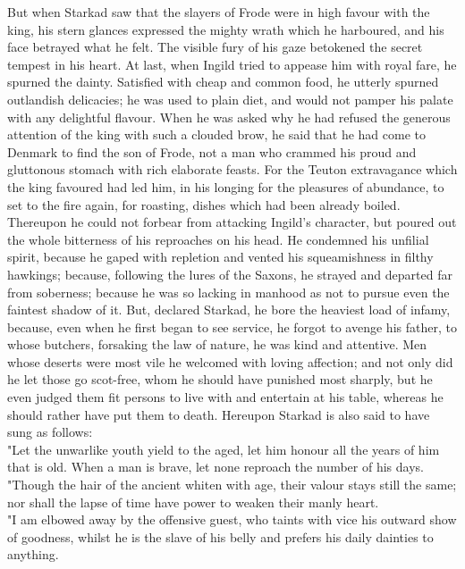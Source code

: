 \documentclass[10pt,a4paper]{report}
\begin{document}
But when Starkad saw that the slayers of Frode were in high favour with the king, his stern glances expressed the mighty wrath which he harboured, and his face betrayed what he felt. The visible fury of his gaze betokened the secret tempest in his heart. At last, when Ingild tried to appease him with royal fare, he spurned the dainty. Satisfied with cheap and common food, he utterly spurned outlandish delicacies; he was used to plain diet, and would not pamper his palate with any delightful flavour. When he was asked why he had refused the generous attention of the king with such a clouded brow, he said that he had come to Denmark to find the son of Frode, not a man who crammed his proud and gluttonous stomach with rich elaborate feasts. For the Teuton extravagance which the king favoured had led him, in his longing for the pleasures of abundance, to set to the fire again, for roasting, dishes which had been already boiled. Thereupon he could not forbear from attacking Ingild's character, but poured out the whole bitterness of his reproaches on his head. He condemned his unfilial spirit, because he gaped with repletion and vented his squeamishness in filthy hawkings; because, following the lures of the Saxons, he strayed and departed far from soberness; because he was so lacking in manhood as not to pursue even the faintest shadow of it. But, declared Starkad, he bore the heaviest load of infamy, because, even when he first began to see service, he forgot to avenge his father, to whose butchers, forsaking the law of nature, he was kind and attentive. Men whose deserts were most vile he welcomed with loving affection; and not only did he let those go scot-free, whom he should have punished most sharply, but he even judged them fit persons to live with and entertain at his table, whereas he should rather have put them to death. Hereupon Starkad is also said to have sung as follows:\\

"Let the unwarlike youth yield to the aged, let him honour all the years of him that is old. When a man is brave, let none reproach the number of his days.\\

"Though the hair of the ancient whiten with age, their valour stays still the same; nor shall the lapse of time have power to weaken their manly heart.\\

"I am elbowed away by the offensive guest, who taints with vice his outward show of goodness, whilst he is the slave of his belly and prefers his daily dainties to anything.\\
\end{document}
